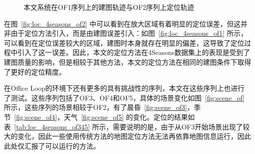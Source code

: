 \begin{figure}
  \centering
  \caption{本文系统在OF1序列上的建图轨迹与OF2序列上定位轨迹}
  \label{fig:loc_gnssmap}
\end{figure}

在图~\ref{fig:loc_4seasons_of2} 中可以看到在放大区域有着明显的定位误差，但这并非由于定位方法引入，而是由建图误差引入：如图~\ref{fig:loc_4seasons_of1} 所示，可以看到在定位误差较大的区域，建图时本身就存在明显的偏差，这导致了定位过程中引入了这一误差。因此，本文的定位方法在4Seasons数据集上的表现是受到了建图质量的影响，但是相较于其他方法，本文的定位方法在相同的建图条件下取得了更好的定位精度。

在Office Loop的环境下还有更多的具有挑战性的序列，本文在这些序列上也进行了测试。这些序列包括了OF3、OF4和OF5，具体的场景变化如图~\ref{fig:scene_of} 所示，这些序列的场景相较于OF2，有了晨昏~\ref{fig:scene_of3}，季节~\ref{fig:scene_of4}，天气~\ref{fig:scene_of5} 的变化。定位的结果如表~\ref{tab:loc_4seasons_of345} 所示，需要说明的是，由于从OF3开始场景出现了较大的变化，因此一些使用传统方法的地图定位方法无法再依靠地图信息运行，因此此处仅汇报了可以运行的方法。

